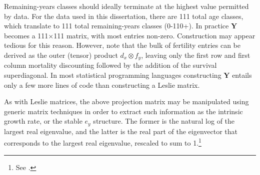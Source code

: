 Remaining-years classes should ideally terminate at the highest value permitted
by data. For the data used in this dissertation, there are 111 total age
classes, which translate to 111 total remaining-years classes (0-110+). In practice 
$\textbf{Y}$ becomes
a 111$\times$111 matrix, with most entries non-zero. Construction may appear
tedious for this reason. However, note that the bulk of fertility entries can
be derived as the outer (tensor) product $d_x \otimes f_y$, leaving only the 
first row and first column mortality discounting followed by the addition of the
survival superdiagonal. In most statistical programming languages 
constructing $\textbf{Y}$ entails only
a few more lines of code than constructing a Leslie matrix.

As with Leslie matrices, the above projection matrix may be manipulated using
generic matrix techniques in order to extract such information as the intrinsic
growth rate, or the stable $e_y$ structure. The former is the natural log of the
largest real eigenvalue, and the latter is the real part of the eigenvector that
corresponds to the largest real eigenvalue, rescaled to sum to 1.\footnote{See
\citet[p.86-87]{caswell2001matrix}.}

 \FloatBarrier